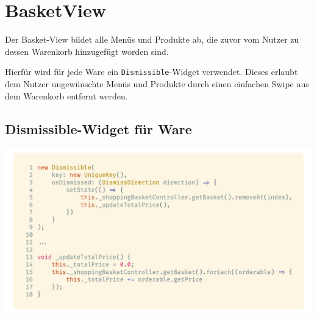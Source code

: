 \section{BasketView}

Der Basket-View bildet alle Menüs und Produkte ab, die zuvor vom Nutzer zu dessen Warenkorb hinzugefügt
worden sind.

Hierfür wird für jede Ware ein \lstinline{Dismissible}-Widget verwendet. Dieses erlaubt dem Nutzer
ungewünschte Menüs und Produkte durch einen einfachen Swipe aus dem Warenkorb entfernt werden.
\cite{flutterDismissible}

\subsection{Dismissible-Widget für Ware}



\begin{code}[H]
    \centering
    \includegraphics[width=1\textwidth]{images/Client/views/basketview/dismissible.png}
    \vspace{-20pt}
    \caption{Dismissible-Widget im Basket-View mit \lstinline{_updateTotalPrice}-Funktion zum Aktualisieren des Gesamtpreises}
\end{code}